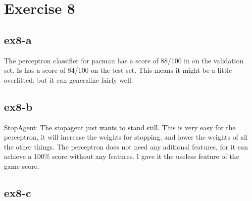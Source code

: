 \section{Exercise 8}
\subsection{ex8-a}
The perceptron classifier for pacman has a score of 88/100 in on the validation set. Is has a score of 84/100 on the test set. This means it might be a little overfitted, but it can generalize fairly well.
\subsection{ex8-b}
StopAgent: The stopagent just wants to stand still. This is very easy for the perceptron, it will increase the weights for stopping, and lower the weights of all the other things. The perceptron does not need any aditional features, for it can achieve a 100\% score without any features. I gave it the useless feature of the game score.
\subsection{ex8-c}
